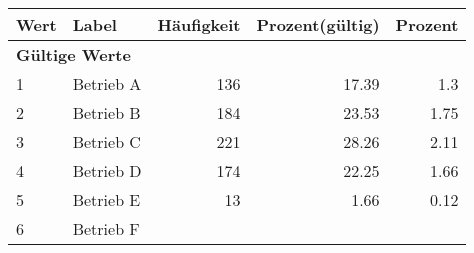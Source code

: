      \begin{longtable}{lXrrr}
     \toprule
     \textbf{Wert} & \textbf{Label} & \textbf{Häufigkeit} & \textbf{Prozent(gültig)} & \textbf{Prozent} \\
     \endhead
     \midrule
     \multicolumn{5}{l}{\textbf{Gültige Werte}}\\

     1 &
     \multicolumn{1}{X}{ Betrieb A   } &


       \num{136} &
       \num[round-mode=places,round-precision=2]{17.39} &
         \num[round-mode=places,round-precision=2]{1.3} \\

     2 &
     \multicolumn{1}{X}{ Betrieb B   } &


       \num{184} &
       \num[round-mode=places,round-precision=2]{23.53} &
         \num[round-mode=places,round-precision=2]{1.75} \\

     3 &
     \multicolumn{1}{X}{ Betrieb C   } &


       \num{221} &
       \num[round-mode=places,round-precision=2]{28.26} &
         \num[round-mode=places,round-precision=2]{2.11} \\

     4 &
     \multicolumn{1}{X}{ Betrieb D   } &


       \num{174} &
       \num[round-mode=places,round-precision=2]{22.25} &
         \num[round-mode=places,round-precision=2]{1.66} \\

     5 &
     \multicolumn{1}{X}{ Betrieb E   } &


       \num{13} &
       \num[round-mode=places,round-precision=2]{1.66} &
         \num[round-mode=places,round-precision=2]{0.12} \\

     6 &
     \multicolumn{1}{X}{ Betrieb F   } &



\end{longtable}
